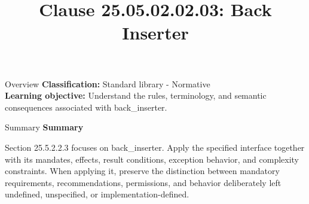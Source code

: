 \documentclass[10pt,letterpaper]{article}
\title{Clause 25.05.02.02.03: Back Inserter}
\author{}
\date{}
\begin{document}
\maketitle
\begin{CornellOverviewBox}{Overview}
\textbf{Classification:} Standard library - Normative\\[2pt]
\textbf{Learning objective:} Understand the rules, terminology, and semantic consequences associated with back\_inserter.
\end{CornellOverviewBox}\begin{CornellSummaryBox}{Summary}
{\sffamily\bfseries\color{Accent} Summary}\par\vspace{3pt}Section 25.5.2.2.3 focuses on back\_inserter. Apply the specified interface together with its mandates, effects, result conditions, exception behavior, and complexity constraints. When applying it, preserve the distinction between mandatory requirements, recommendations, permissions, and behavior deliberately left undefined, unspecified, or implementation-defined.
\end{CornellSummaryBox}
\end{document}

